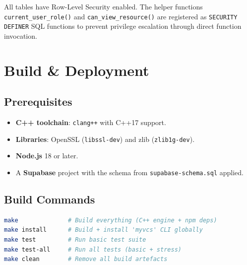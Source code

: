 \documentclass{article}
\begin{document}
All tables have Row-Level Security enabled.  The helper functions
\texttt{current\_user\_role()} and \texttt{can\_view\_resource()} are
registered as \texttt{SECURITY DEFINER} SQL functions to prevent privilege
escalation through direct function invocation.

\section{Build \& Deployment}

\subsection{Prerequisites}

\begin{itemize}
    \item \textbf{C++ toolchain}: \texttt{clang++} with C++17 support.
    \item \textbf{Libraries}: OpenSSL (\texttt{libssl-dev}) and zlib
          (\texttt{zlib1g-dev}).
    \item \textbf{Node.js} 18 or later.
    \item A \textbf{Supabase} project with the schema from
          \texttt{supabase-schema.sql} applied.
\end{itemize}

\subsection{Build Commands}

\begin{lstlisting}[language=bash, basicstyle=\ttfamily\small,
                   breaklines=true, frame=single]
make              # Build everything (C++ engine + npm deps)
make install      # Build + install 'myvcs' CLI globally
make test         # Run basic test suite
make test-all     # Run all tests (basic + stress)
make clean        # Remove all build artefacts
\end{lstlisting}
\end{document}
